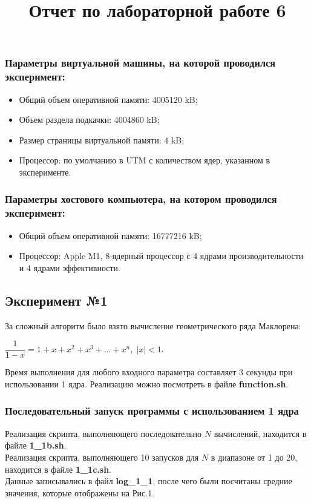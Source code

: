 \documentclass{article}
\begin{document}
\title{Отчет по лабораторной работе 6}
\date{}
\maketitle

\subsubsection*{Параметры виртуальной машины, на которой проводился эксперимент:}
\begin{itemize}
    \item Общий объем оперативной памяти: 4005120 kB;
    \item Объем раздела подкачки: 4004860 kB;
    \item Размер страницы виртуальной памяти: 4 kB;
    \item Процессор: по умолчанию в UTM с количеством ядер, указанном в эксперименте.
\end{itemize}

\subsubsection*{Параметры хостового компьютера, на котором проводился эксперимент:}
\begin{itemize}
    \item Общий объем оперативной памяти: 16777216 kB;
    \item Процессор: Apple M1, 8‑ядерный процессор с 4 ядрами производительности и 4 ядрами эффективности.
\end{itemize}

\bigskip

\subsection*{Эксперимент №1}
За сложный алгоритм было взято вычисление геометрического ряда Маклорена: 

\medskip 

\noindent $\dfrac{1}{1 - x} = 1 + x + x^{2} + x^{3} + \dots + x^{n}, \; |x| < 1$. 

\medskip

\noindent Время выполнения для любого входного параметра составляет 3 секунды при использовании 1 ядра. Реализацию можно посмотреть в файле \textbf{function.sh}.

\subsubsection*{Последовательный запуск программы с использованием 1 ядра}
Реализация скрипта, выполняющего последовательно $N$ вычислений, находится в файле \textbf{1\_1b.sh}. \\
Реализация скрипта, выполняющего 10 запусков для $N$ в диапазоне от 1 до 20, находится в файле \textbf{1\_1c.sh}. \\
Данные записывались в файл \textbf{log\_1\_1}, после чего были посчитаны средние значения, которые отображены на Рис.1.
\end{document}
